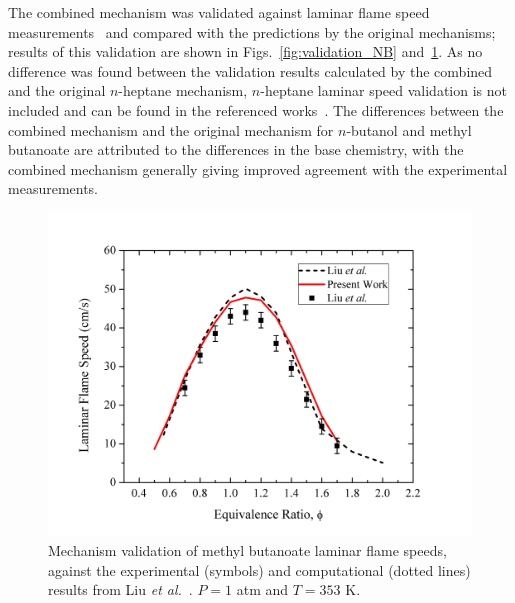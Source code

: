 The combined mechanism  was validated against laminar flame speed measurements~\cite{liu11} and compared with the predictions by the original mechanisms; results of this validation are shown in Figs.~\ref{fig:validation_NB} and~\ref{fig:validation_MB}.  As no difference was found between the validation results calculated by the combined and the original $n$-heptane mechanism, $n$-heptane laminar speed validation is not included and can be found in the referenced works~\cite{blanquart09b,narayanaswamy10}.  The differences between the combined mechanism and the original mechanism for $n$-butanol and methyl butanoate are attributed to the differences in the base chemistry, with the combined mechanism generally giving improved agreement with the experimental measurements.  

\begin{figure}[t]
  \centering
  \scriptsize
  \includegraphics[width=1.0\textwidth]{ch-biofuel/MB.png}
  \normalsize
  \caption{Mechanism validation of methyl butanoate laminar flame speeds, against the experimental (symbols) and computational (dotted lines) results from Liu \emph{et al.}~\cite{liu11}. $P=1$ atm and $T=353$ K.}
  \label{fig:validation_MB}
\end{figure}

